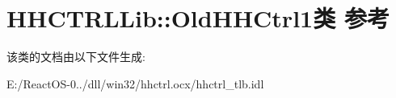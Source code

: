 \hypertarget{class_h_h_c_t_r_l_lib_1_1_old_h_h_ctrl1}{}\section{H\+H\+C\+T\+R\+L\+Lib\+:\+:Old\+H\+H\+Ctrl1类 参考}
\label{class_h_h_c_t_r_l_lib_1_1_old_h_h_ctrl1}


该类的文档由以下文件生成\+:\begin{DoxyCompactItemize}
\item 
E\+:/\+React\+O\+S-\/0../dll/win32/hhctrl.\+ocx/hhctrl\+\_\+tlb.\+idl\end{DoxyCompactItemize}

